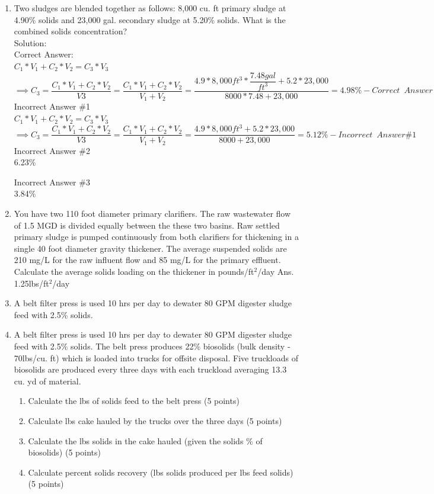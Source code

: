 \documentclass{article}
\begin{document}
\begin{enumerate}
\item Two sludges are blended together as follows: 8,000 cu. ft primary sludge at 4.90\% solids and 23,000 gal. secondary sludge at 5.20\% solids. What is the combined solids concentration?\\
Solution:\\
Correct Answer:\\

$
C_1*V_1 + C_2*V_2 = C_3*V_3$\\
$\implies C_3 = \dfrac{C_1*V_1 + C_2*V_2}{V3}=\dfrac{C_1*V_1 + C_2*V_2}{V_1 + V_2}=\dfrac{4.9*8,000ft^3*\dfrac{7.48gal}{ft^3} + 5.2*23,000}{8000*7.48 + 23,000}=\boxed{4.98\%} - Correct \enspace Answer
$\\

\vspace{0.5cm}
Incorrect Answer \#1\\
$
C_1*V_1 + C_2*V_2 = C_3*V_3$\\
$\implies C_3 = \dfrac{C_1*V_1 + C_2*V_2}{V3}=\dfrac{C_1*V_1 + C_2*V_2}{V_1 + V_2}=\dfrac{4.9*8,000ft^3 + 5.2*23,000}{8000 + 23,000}=\boxed{5.12\%} - Incorrect \enspace Answer \#1
$\\

\vspace{0.5cm}
Incorrect Answer \#2\\
6.23\%

\vspace{0.5cm}
Incorrect Answer \#3\\
3.84\%

\item You have two  110  foot diameter primary  clarifiers.  The raw  wastewater flow of 1.5  MGD is divided equally  between the these two  basins.   Raw settled primary sludge  is pumped continuously  from both clarifiers  for thickening  in  a single  40 foot  diameter gravity thickener.  The average suspended  solids are 210  mg/L for the raw influent flow and 85 mg/L for the primary effluent.  Calculate the  average solids  loading on the thickener in pounds/ft$^2$/day
Ans. 1.25lbs/ft$^2$/day


\item A belt filter press is used 10 hrs per day to dewater 80 GPM digester sludge feed with 2.5\% solids.


\item A belt filter press is used 10 hrs per day to dewater 80 GPM digester sludge feed with 2.5\% solids. The belt press produces 22\% biosolids (bulk density - 70lbs/cu. ft) which is loaded into trucks for offsite disposal. Five truckloads of biosolids are produced every three days with each truckload averaging 13.3 cu. yd of material.
\begin{enumerate}
\item Calculate the lbs of solids feed to the belt press (5 points) 
\item Calculate lbs cake hauled by the trucks over the three days (5 points) 
\item Calculate the lbs solids in the cake hauled (given the solids \% of biosolids) (5 points) 
\item Calculate percent solids recovery (lbs solids produced per lbs feed solids) (5 points) 


\end{enumerate}
\end{enumerate}
\end{document}
